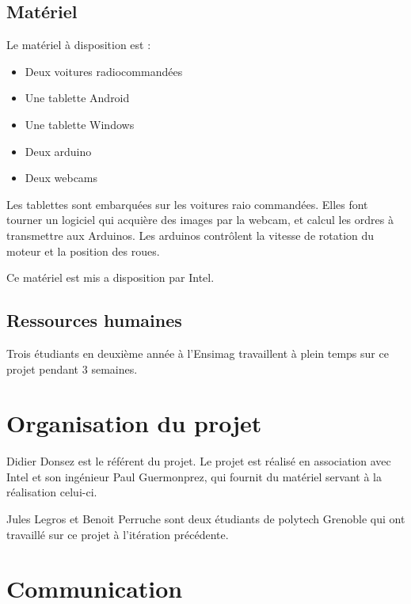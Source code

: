 \documentclass[a4paper,12pt]{article}
\begin{document}
\subsection{Matériel}

Le matériel à disposition est :
\begin{itemize}
    \item Deux voitures radiocommandées
    \item Une tablette Android
    \item Une tablette Windows
    \item Deux arduino
    \item Deux webcams
\end{itemize}

Les tablettes sont embarquées sur les voitures raio commandées. Elles font
tourner un logiciel qui acquière des images par la webcam, et calcul les ordres
à transmettre aux Arduinos. Les arduinos contrôlent la vitesse de rotation du
moteur et la position des roues.

Ce matériel est mis a disposition par Intel.

\subsection{Ressources humaines}

Trois étudiants en deuxième année à l'Ensimag travaillent à plein temps sur ce
projet pendant 3 semaines.










\section{Organisation du projet}

Didier Donsez est le référent du projet.
Le projet est réalisé en association avec Intel et son ingénieur Paul Guermonprez, qui
fournit du matériel servant à la réalisation celui-ci.

Jules Legros et Benoit Perruche sont deux étudiants de polytech Grenoble qui
ont travaillé sur ce projet à l'itération précédente.







\section{Communication}
\end{document}
